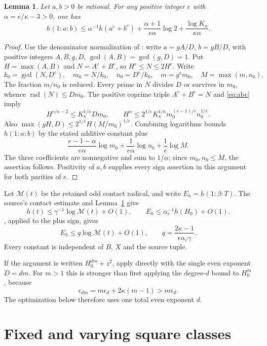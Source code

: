 \documentclass[11pt,a4paper]{article}
\newtheorem{lemma}[theorem]{Lemma}
\DeclareMathOperator{\rad}{rad}
\begin{document}
\begin{lemma}\label{lem:positivepowers}
Let $a,b>0$ be rational. For any positive integer $e$ with
$\alpha=e/\kappa-3>0$, one has
\[
 h(1:a:b)\le\alpha^{-1}h(a^e+b^e)
 +\frac{\alpha+1}{e\alpha}\log2
 +\frac{\log K_\kappa}{\kappa\alpha}.
\]
\end{lemma}
\begin{proof}
Use the denominator normalization of \cite[Lemma 2.2]{Conditional}:
write $a=gA/D$, $b=gB/D$, with positive integers $A,B,g,D$,
$\gcd(A,B)=\gcd(g,D)=1$. Put $H=\max(A,B)$ and
$N=A^e+B^e$, so $H^e\le N\le2H^e$. Write
\[
 k_0=\gcd(N,D^e),\quad m_0=N/k_0,\quad n_0=D^e/k_0,
 \quad m=g^em_0,\quad M=\max(m,n_0).
\]
The fraction $m/n_0$ is reduced. Every prime in $N$ divides $D$
or survives in $m_0$, whence $\rad(N)\le Dm_0$. The positive
coprime triple $A^e+B^e=N$ and \eqref{eq:abc} imply
\[
 H^{e/\kappa-2}\le K_\kappa^{1/\kappa}Dm_0,
 \qquad
 H^\alpha\le2^{1/e}K_\kappa^{1/\kappa}
               m_0^{(e-1)/e}n_0^{1/e}.
\]
Also $\max(gH,D)\le2^{1/e}H(M/m_0)^{1/e}$.
Combining logarithms bounds $h(1:a:b)$ by the stated additive
constant plus
\[
 \frac{e-1-\alpha}{e\alpha}\log m_0
 +\frac1{e\alpha}\log n_0+\frac1e\log M.
\]
The three coefficients are nonnegative and sum to $1/\alpha$;
since $m_0,n_0\le M$, the assertion follows. Positivity of $a,b$
supplies every sign assertion in this argument for both parities of $e$.
\end{proof}

Let $\mathcal M(t)$ be the retained odd contact radical, and write
$E_h=h(1:\beta:T)$. The source's contact estimate and
Lemma~\ref{lem:positivepowers} give
\[
 h(t)\le\gamma^{-1}\log\mathcal M(t)+O(1),\qquad
 E_h\le\alpha_e^{-1}h(H_0)+O(1).
\]
\cite[Theorem 1.1]{Height}, applied to the plus sign, gives
\begin{equation}\label{eq:height}
 E_h\le q\log\mathcal M(t)+O(1),\qquad
 q=\frac{2\kappa-1}{\epsilon\alpha_e\gamma}.
\end{equation}
Every constant is independent of $B$, $X$ and the source tuple.

If the argument is written $H_0^{dm}+z^2$, apply
\cite[Theorem 1.1]{Height} directly
with the single even exponent $D=dm$. For $m>1$ this is stronger
than first applying the degree-$d$ bound to $H_0^m$, because
\[
 \epsilon_{dm}=m\epsilon_d+2\kappa(m-1)>m\epsilon_d.
\]
The optimization below therefore uses one total even exponent $d$.

\section{Fixed and varying square classes}
\end{document}
